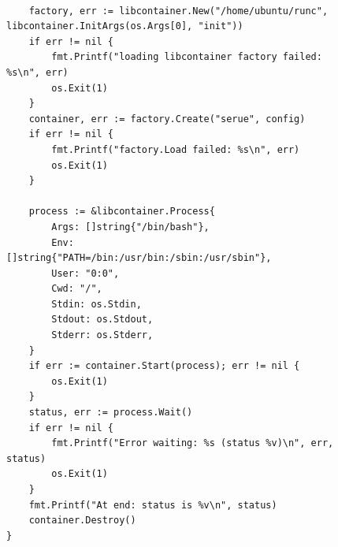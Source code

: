 \documentclass{beamer}
\begin{document}
\begin{frame}[fragile]
\begin{figure}
{\tiny
   \begin{lstlisting}

	factory, err := libcontainer.New("/home/ubuntu/runc", libcontainer.InitArgs(os.Args[0], "init"))
	if err != nil {
		fmt.Printf("loading libcontainer factory failed: %s\n", err)
		os.Exit(1)
	}
	container, err := factory.Create("serue", config)
	if err != nil {
		fmt.Printf("factory.Load failed: %s\n", err)
		os.Exit(1)
	}

	process := &libcontainer.Process{
		Args: []string{"/bin/bash"},
		Env: []string{"PATH=/bin:/usr/bin:/sbin:/usr/sbin"},
		User: "0:0",
		Cwd: "/",
		Stdin: os.Stdin,
		Stdout: os.Stdout,
		Stderr: os.Stderr,
	}
	if err := container.Start(process); err != nil {
		os.Exit(1)
	}
	status, err := process.Wait()
	if err != nil {
		fmt.Printf("Error waiting: %s (status %v)\n", err, status)
		os.Exit(1)
	}
	fmt.Printf("At end: status is %v\n", status)
	container.Destroy()
}
  \end{lstlisting}
}
\end{figure}
\end{frame}

\end{document}
